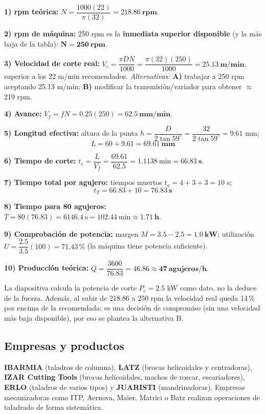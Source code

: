 \documentclass[12pt,a4paper]{article}
\begin{document}
\textbf{1) rpm teórica:} $N = \dfrac{1000(22)}{\pi(32)} = \mathbf{218.86\ rpm}$.

\textbf{2) rpm de máquina:} 250 rpm es la \textbf{inmediata superior disponible}
(y la más baja de la tabla): $\mathbf{N = 250\ rpm}$.

\textbf{3) Velocidad de corte real:} $V_c = \dfrac{\pi D N}{1000} = \dfrac{\pi(32)(250)}{1000} = \mathbf{25.13\ m/min}$, superior a los 22 m/min recomendados. \emph{Alternativas:} \textbf{A)} trabajar a 250 rpm aceptando 25.13 m/min; \textbf{B)} modificar la transmisión/variador para obtener $\approx$ 219 rpm.

\textbf{4) Avance:} $V_f = f N = 0.25(250) = \mathbf{62.5\ mm/min}$.

\textbf{5) Longitud efectiva:} altura de la punta $h = \dfrac{D}{2\tan 59^\circ}
	= \dfrac{32}{2\tan 59^\circ} = 9.61$ mm; \[ L = 60 + 9.61 = \mathbf{69.61\ mm}
\]

\textbf{6) Tiempo de corte:} $t_c = \dfrac{L}{V_f} = \dfrac{69.61}{62.5} =
	1.1138\ \text{min} = \mathbf{66.83\ s}$.

\textbf{7) Tiempo total por agujero:} tiempos muertos $t_a = 4 + 3 + 3 = 10$ s;
\[ t_T = 66.83 + 10 = \mathbf{76.83\ s} \]

\textbf{8) Tiempo para 80 agujeros:} $T = 80(76.83) = 6146.4\ \text{s} = 102.44\
	\text{min} \approx \mathbf{1.71\ h}$.

\textbf{9) Comprobación de potencia:} margen $M = 3.5 - 2.5 = \mathbf{1.0\ kW}$;
utilización $U = \dfrac{2.5}{3.5}(100) = \mathbf{71.43\,\%}$ (la máquina tiene
potencia suficiente).

\textbf{10) Producción teórica:} $Q = \dfrac{3600}{76.83} = 46.86 \approx \mathbf{47\ agujeros/h}$.

\begin{aviso}
	La diapositiva calcula la potencia de corte $P_c = 2.5$ kW como dato, no la
	deduce de la fuerza. Además, al subir de 218.86 a 250 rpm la velocidad real
	queda 14\,\% por encima de la recomendada; es una decisión de compromiso (sin
	una velocidad más baja disponible), por eso se plantea la alternativa B.
\end{aviso}

\subsection{Empresas y productos}
\textbf{IBARMIA} (taladros de columna), \textbf{LATZ} (brocas helicoidales y centradoras), \textbf{IZAR Cutting Tools} (brocas helicoidales, machos de roscar, escariadores), \textbf{ERLO} (taladros de varios tipos) y \textbf{JUARISTI} (mandrinadoras). Empresas mecanizadoras como ITP, Aernova, Maier, Matrici o Batz realizan operaciones de taladrado de forma sistemática.
\end{document}
